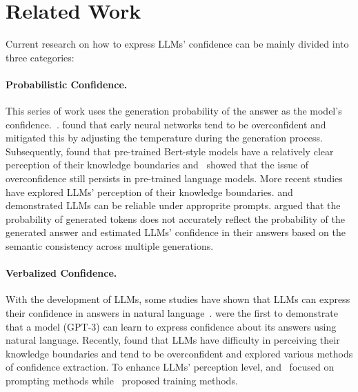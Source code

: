 \section{Related Work}
Current research on how to express LLMs' confidence can be mainly divided into three categories:
\paragraph{Probabilistic Confidence.}
This series of work uses the generation probability of the answer as the model's confidence.~\citep{guo2017calibration,desai2020calibration,jiang2021can,kadavath2022language,si2022prompting,kuhn2023semantic}. \citet{guo2017calibration} found that early neural networks tend to be overconfident and mitigated this by adjusting the temperature during the generation process. Subsequently, \citet{desai2020calibration} found that pre-trained Bert-style models have a relatively clear perception of their knowledge boundaries and~\citet{jiang2021can} showed that the issue of overconfidence still persists in pre-trained language models. More recent studies have explored LLMs’ perception of their knowledge boundaries. \citet{kadavath2022language} and~\citet{si2022prompting} demonstrated LLMs can be reliable under approprite prompts. \citet{kuhn2023semantic} argued that the probability of generated tokens does not accurately reflect the probability of the generated answer and estimated LLMs' confidence in their answers based on the semantic consistency across multiple generations.

\paragraph{Verbalized Confidence.} 
With the development of LLMs, some studies have shown that LLMs can express their confidence in answers in natural language~\citep{lin2022teaching, yin2023large, tian2023just,xiong2023can,yang2023alignment,ni2024llms}. \citet{lin2022teaching} were the first to demonstrate that a model (GPT-3) can learn to express confidence about its answers using natural language. Recently, \citet{yin2023large} found that LLMs have difficulty in perceiving their knowledge boundaries and tend to be overconfident and \citet{xiong2023can} explored various methods of confidence extraction. To enhance LLMs' perception level, \citet{tian2023just} and~\citet{ni2024llms} focused on prompting methods while~\citet{yang2023alignment} proposed training methods.

